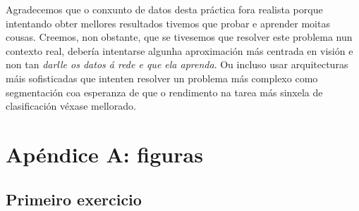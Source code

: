 \documentclass{article}
\begin{document}
Agradecemos que o conxunto de datos desta práctica fora realista porque intentando obter mellores resultados tivemos que probar e aprender moitas cousas. Creemos, non obstante, que se tivesemos que resolver este problema nun contexto real, debería intentarse algunha aproximación más centrada en visión e non tan \emph{darlle os datos á rede e que ela aprenda}. Ou incluso usar arquitecturas máis sofisticadas que intenten resolver un problema más complexo como segmentación coa esperanza de que o rendimento na tarea más sinxela de clasificación véxase mellorado.

\newpage

\section{Apéndice A: figuras}
\subsection{Primeiro exercicio}
\end{document}
